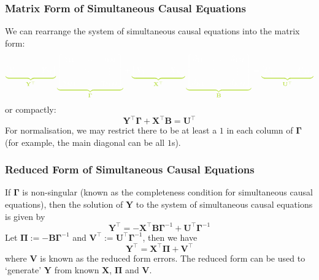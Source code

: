 \documentclass[11pt]{report} %
\begin{document}
\subsubsection{Matrix Form of Simultaneous Causal Equations}

We can rearrange the system of simultaneous causal equations into the matrix form:
\begin{equation}
\green\underbrace{\black\begin{bmatrix}
Y_{1} & \dots & Y_{M}
\end{bmatrix}}_{\green \mathbf{Y}^{\top}}\black\green\underbrace{\black\begin{bmatrix}
\gamma_{11} & \dots & \gamma_{1M} \\
\vdots & \ddots & \vdots \\
\gamma_{M1} & \dots & \gamma_{MM}
\end{bmatrix}}_{\green \boldsymbol{\Gamma}}\black + \green\underbrace{\black\begin{bmatrix}
X_{1} & \dots & X_{K}
\end{bmatrix}}_{\green \mathbf{X}^{\top}}\black \green\underbrace{\black\begin{bmatrix}
\beta_{11} & \dots & \beta_{1M} \\
\vdots & \ddots & \vdots \\
\beta_{K1} & \dots & \beta_{KM}
\end{bmatrix}}_{\green \mathbf{B}}\black = \green\underbrace{\black\begin{bmatrix}
U_{1} & \dots & U_{M}
\end{bmatrix}}_{\green \mathbf{U}^{\top}}\black
\end{equation}
or compactly:
\begin{equation}
\mathbf{Y}^{\top}\boldsymbol{\Gamma} + \mathbf{X}^{\top}\mathbf{B} = \mathbf{U}^{\top}
\end{equation}
For normalisation, we may restrict there to be at least a $1$ in each column of $\boldsymbol{\Gamma}$ (for example, the main diagonal can be all $1$s).

\subsubsection{Reduced Form of Simultaneous Causal Equations}

If $\boldsymbol{\Gamma}$ is non-singular (known as the completeness condition for simultaneous causal equations), then the solution of $\mathbf{Y}$ to the system of simultaneous causal equations is given by
\begin{equation}
\mathbf{Y}^{\top} = -\mathbf{X}^{\top}\mathbf{B}\boldsymbol{\Gamma}^{-1} + \mathbf{U}^{\top}\boldsymbol{\Gamma}^{-1}
\end{equation}
Let $\boldsymbol{\Pi} := -\mathbf{B}\boldsymbol{\Gamma}^{-1}$ and $\mathbf{V}^{\top} := \mathbf{U}^{\top}\boldsymbol{\Gamma}^{-1}$, then we have
\begin{equation}
\mathbf{Y}^{\top} = \mathbf{X}^{\top}\boldsymbol{\Pi} + \mathbf{V}^{\top}
\end{equation}
where $\mathbf{V}$ is known as the reduced form errors. The reduced form can be used to `generate' $\mathbf{Y}$ from known $\mathbf{X}$, $\boldsymbol{\Pi}$ and $\mathbf{V}$. 
\end{document}
